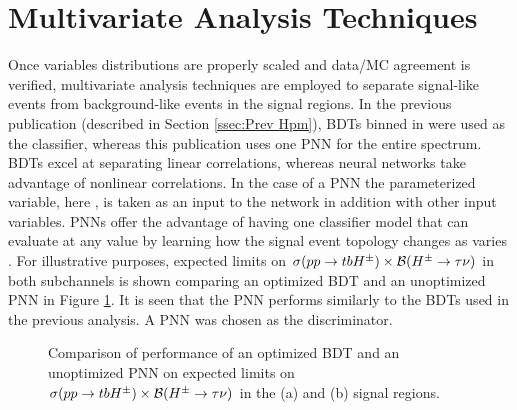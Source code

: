 	\clearpage
	\section{Multivariate Analysis Techniques}\label{sec:mva}
		Once variables distributions are properly scaled and data/\gls{MC} agreement is verified, multivariate analysis techniques are employed to separate signal-like events from background-like events in the signal regions. In the previous publication (described in Section \ref{ssec:Prev Hpm}), \glspl{BDT} binned in \mHpm were used as the classifier, whereas this publication uses one \gls{PNN} for the entire \mHpm spectrum. \glspl{BDT} excel at separating linear correlations, whereas neural networks take advantage of nonlinear correlations. In the case of a \gls{PNN} the parameterized variable, here \mHpm, is taken as an input to the network in addition with other input variables. \gls{PNN}s offer the advantage of having one classifier model that can evaluate at any \mHpm value by learning how the signal event topology changes as \mHpm varies \cite{PNN}. For illustrative purposes, expected limits on $\sigma(pp\to tbH^{\pm})\times \mathrm{\cal{B}}(H^{\pm} \to \tau \nu)$ in both subchannels is shown comparing an optimized \gls{BDT} and an unoptimized \gls{PNN} in Figure \ref{fig:bdt-vs-pnn-expected-limits}. It is seen that the \gls{PNN} performs similarly to the \glspl{BDT} used in the previous analysis. A \gls{PNN} was chosen as the discriminator. 

		\begin{figure}
		\caption{Comparison of performance of an optimized \gls{BDT} and an unoptimized \gls{PNN} on expected limits on $\sigma(pp\to tbH^{\pm})\times \mathrm{\cal{B}}(H^{\pm} \to \tau \nu)$ in the \taujets (a) and \taulep (b) signal regions. }
		\label{fig:bdt-vs-pnn-expected-limits}
		\end{figure}

